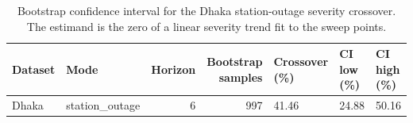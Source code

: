 \begin{table}
\caption{Bootstrap confidence interval for the Dhaka station-outage severity crossover. The estimand is the zero of a linear severity trend fit to the sweep points.}
\label{tab:crossover_bootstrap}
\begin{tabular}{llrrlll}
\toprule
Dataset & Mode & Horizon & Bootstrap samples & Crossover (\%) & CI low (\%) & CI high (\%) \\
\midrule
Dhaka & station\_outage & 6 & 997 & 41.46 & 24.88 & 50.16 \\
\bottomrule
\end{tabular}
\end{table}
